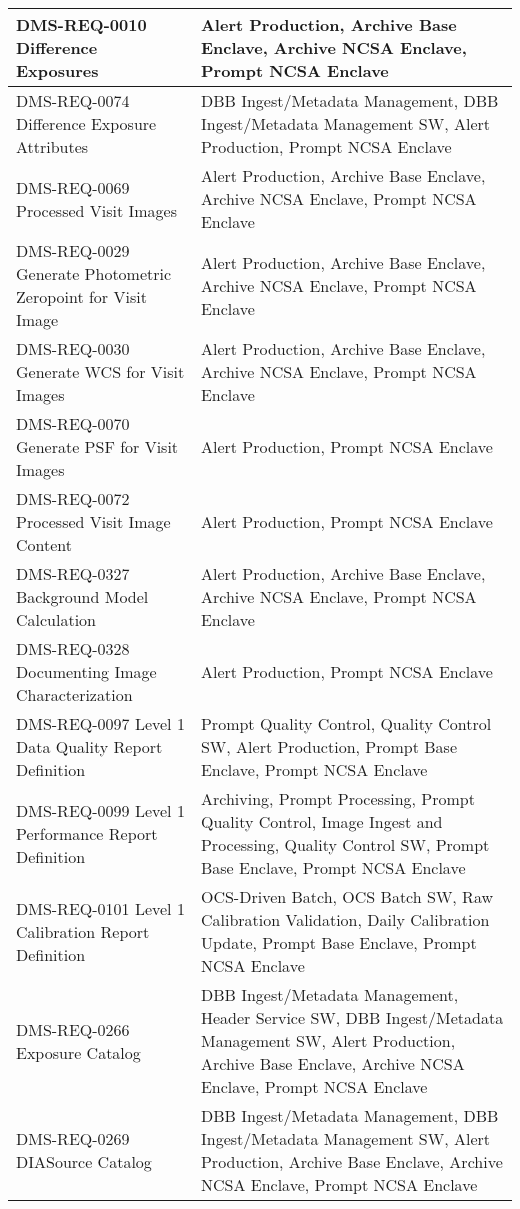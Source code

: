 \begin{xtabular}{p{0.4\textwidth}p{0.55\textwidth}}
DMS-REQ-0010 Difference Exposures & Alert Production, Archive Base Enclave, Archive NCSA Enclave, Prompt NCSA Enclave \\ \hline
DMS-REQ-0074 Difference Exposure Attributes & DBB Ingest/Metadata Management, DBB Ingest/Metadata Management SW, Alert Production, Prompt NCSA Enclave \\ \hline
DMS-REQ-0069 Processed Visit Images & Alert Production, Archive Base Enclave, Archive NCSA Enclave, Prompt NCSA Enclave \\ \hline
DMS-REQ-0029 Generate Photometric Zeropoint for Visit Image & Alert Production, Archive Base Enclave, Archive NCSA Enclave, Prompt NCSA Enclave \\ \hline
DMS-REQ-0030 Generate WCS for Visit Images & Alert Production, Archive Base Enclave, Archive NCSA Enclave, Prompt NCSA Enclave \\ \hline
DMS-REQ-0070 Generate PSF for Visit Images & Alert Production, Prompt NCSA Enclave \\ \hline
DMS-REQ-0072 Processed Visit Image Content & Alert Production, Prompt NCSA Enclave \\ \hline
DMS-REQ-0327 Background Model Calculation & Alert Production, Archive Base Enclave, Archive NCSA Enclave, Prompt NCSA Enclave \\ \hline
DMS-REQ-0328 Documenting Image Characterization & Alert Production, Prompt NCSA Enclave \\ \hline
DMS-REQ-0097 Level 1 Data Quality Report Definition & Prompt Quality Control, Quality Control SW, Alert Production, Prompt Base Enclave, Prompt NCSA Enclave \\ \hline
DMS-REQ-0099 Level 1 Performance Report Definition & Archiving, Prompt Processing, Prompt Quality Control, Image Ingest and Processing, Quality Control SW, Prompt Base Enclave, Prompt NCSA Enclave \\ \hline
DMS-REQ-0101 Level 1 Calibration Report Definition & OCS-Driven Batch, OCS Batch SW, Raw Calibration Validation, Daily Calibration Update, Prompt Base Enclave, Prompt NCSA Enclave \\ \hline
DMS-REQ-0266 Exposure Catalog & DBB Ingest/Metadata Management, Header Service SW, DBB Ingest/Metadata Management SW, Alert Production, Archive Base Enclave, Archive NCSA Enclave, Prompt NCSA Enclave \\ \hline
DMS-REQ-0269 DIASource Catalog & DBB Ingest/Metadata Management, DBB Ingest/Metadata Management SW, Alert Production, Archive Base Enclave, Archive NCSA Enclave, Prompt NCSA Enclave \\ \hline

\end{xtabular}
